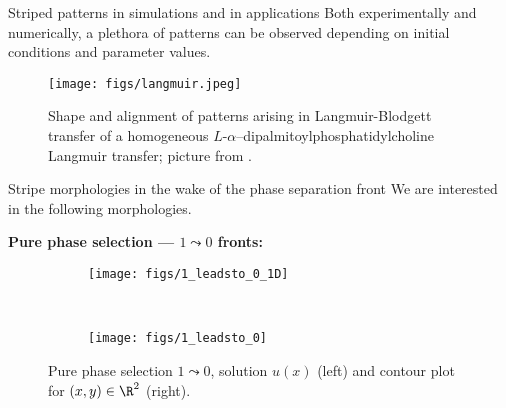 \documentclass[final]{beamer}
\newlength{\onecolwid}
\begin{document}
\begin{frame}[t]
\begin{columns}[t]
\begin{column}{\onecolwid}\vspace{-.6in} %


\begin{block}{Striped patterns in simulations and in applications }
Both experimentally and numerically, a plethora of patterns can be observed depending on initial conditions and parameter values.
\begin{figure}
\centering
\texttt{[image: figs/langmuir.jpeg]}
\caption{ Shape and alignment of patterns arising in Langmuir-Blodgett transfer of  a homogeneous $L$-$\alpha$--dipalmitoylphosphatidylcholine Langmuir transfer; picture from  \cite{langmuir2}.} 
\end{figure}

\end{block}


\begin{block}{Stripe morphologies in the wake of the phase separation front}
We are interested in the following morphologies.

\indent \textbf{Pure phase selection --- \textbf{$1\leadsto 0	$} fronts:}

\begin{figure}[htb]
    \centering
    \begin{subfigure}[b]{0.45\textwidth}
          \centering
        \texttt{[image: figs/1\_leadsto\_0\_1D]}
    \end{subfigure}
    ~ %
    \begin{subfigure}[b]{0.45\textwidth}
    \centering
    \texttt{[image: figs/1\_leadsto\_0]}
        \end{subfigure}
    \caption{Pure phase selection $1 \leadsto 0$, solution $u(x)$ (left) and contour plot for $(x,y)\in\R^2$ (right). \label{Figure_1-1_leadsto_0}}
\end{figure}


\end{block}
\end{column}
\end{columns}
\end{frame}
\end{document}
